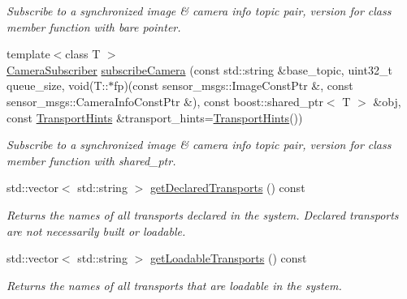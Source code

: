\begin{DoxyCompactItemize}
\begin{DoxyCompactList}\small\item\em Subscribe to a synchronized image \& camera info topic pair, version for class member function with bare pointer. \end{DoxyCompactList}\item 
\hypertarget{classimage__transport_1_1_image_transport_a9ae4f85ea9e01e4a2729e88557654038}{{\footnotesize template$<$class T $>$ }\\\hyperlink{classimage__transport_1_1_camera_subscriber}{Camera\-Subscriber} \hyperlink{classimage__transport_1_1_image_transport_a9ae4f85ea9e01e4a2729e88557654038}{subscribe\-Camera} (const std\-::string \&base\-\_\-topic, uint32\-\_\-t queue\-\_\-size, void(T\-::$\ast$fp)(const sensor\-\_\-msgs\-::\-Image\-Const\-Ptr \&, const sensor\-\_\-msgs\-::\-Camera\-Info\-Const\-Ptr \&), const boost\-::shared\-\_\-ptr$<$ T $>$ \&obj, const \hyperlink{classimage__transport_1_1_transport_hints}{Transport\-Hints} \&transport\-\_\-hints=\hyperlink{classimage__transport_1_1_transport_hints}{Transport\-Hints}())}\label{classimage__transport_1_1_image_transport_a9ae4f85ea9e01e4a2729e88557654038}

\begin{DoxyCompactList}\small\item\em Subscribe to a synchronized image \& camera info topic pair, version for class member function with shared\-\_\-ptr. \end{DoxyCompactList}\item 
\hypertarget{classimage__transport_1_1_image_transport_ab2afc62b0061f6cac30f562a970cf20b}{std\-::vector$<$ std\-::string $>$ \hyperlink{classimage__transport_1_1_image_transport_ab2afc62b0061f6cac30f562a970cf20b}{get\-Declared\-Transports} () const }\label{classimage__transport_1_1_image_transport_ab2afc62b0061f6cac30f562a970cf20b}

\begin{DoxyCompactList}\small\item\em Returns the names of all transports declared in the system. Declared transports are not necessarily built or loadable. \end{DoxyCompactList}\item 
\hypertarget{classimage__transport_1_1_image_transport_aa7da86fe2fe1b176dd4ce3f3cf6d03ba}{std\-::vector$<$ std\-::string $>$ \hyperlink{classimage__transport_1_1_image_transport_aa7da86fe2fe1b176dd4ce3f3cf6d03ba}{get\-Loadable\-Transports} () const }\label{classimage__transport_1_1_image_transport_aa7da86fe2fe1b176dd4ce3f3cf6d03ba}

\begin{DoxyCompactList}\small\item\em Returns the names of all transports that are loadable in the system. \end{DoxyCompactList}\end{DoxyCompactItemize}


